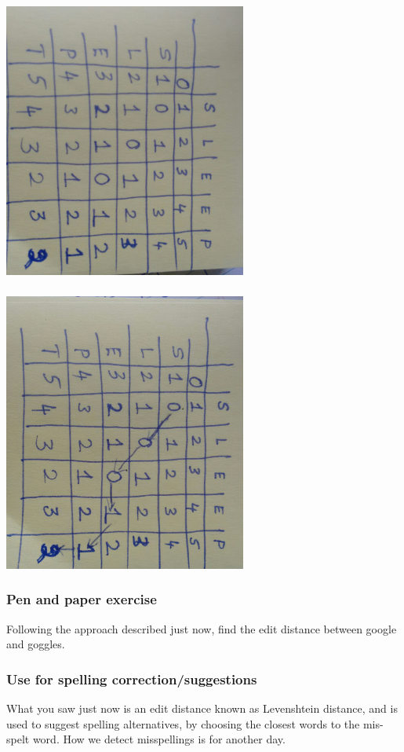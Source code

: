 \documentclass{beamer}
\begin{document}
\begin{frame}
\frametitle{}
\includegraphics[width=0.6\textwidth,angle=90]{leven.jpg}
\end{frame}

\begin{frame}
\frametitle{}
\includegraphics[width=0.6\textwidth,angle=90]{leven2.jpg}
\end{frame}

\begin{frame}
\frametitle{Pen and paper exercise}
Following the approach described just now, find the edit distance between google and goggles.
\end{frame}

\begin{frame}
\frametitle{Use for spelling correction/suggestions}
What you saw just now is an edit distance known as Levenshtein distance, and is used to suggest spelling alternatives, by choosing the closest words to the mis-spelt word. How we detect misspellings is for another day.
\end{frame}
\end{document}
